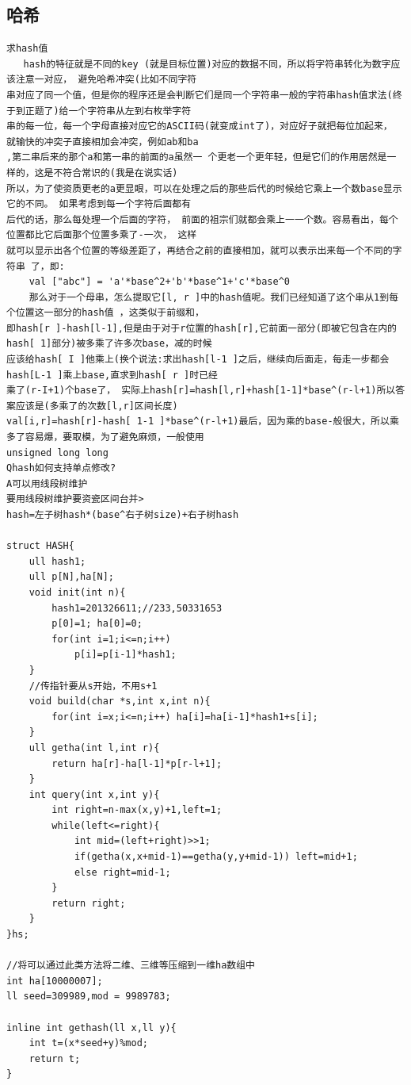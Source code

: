 \documentclass[twoside]{article}
\begin{document}
\subsection{哈希}
\begin{lstlisting}
求hash值
   hash的特征就是不同的key (就是目标位置)对应的数据不同，所以将字符串转化为数字应该注意一对应， 避免哈希冲突(比如不同字符
串对应了同一个值，但是你的程序还是会判断它们是同一个字符串一般的字符串hash值求法(终于到正题了)给一个字符串从左到右枚举字符
串的每一位，每一个字母直接对应它的ASCII码(就变成int了)，对应好子就把每位加起来， 就输快的冲突子直接相加会冲突，例如ab和ba
,第二串后来的那个a和第一串的前面的a虽然一 个更老一个更年轻，但是它们的作用居然是一样的，这是不符合常识的(我是在说实话)
所以，为了使资质更老的a更显眼，可以在处理之后的那些后代的时候给它乘上一个数base显示它的不同。 如果考虑到每一个字符后面都有
后代的话，那么每处理一个后面的字符， 前面的祖宗们就都会乘上一一个数。容易看出，每个位置都比它后面那个位置多乘了-一次， 这样
就可以显示出各个位置的等级差距了，再结合之前的直接相加，就可以表示出来每一个不同的字符串 了，即:
    val ["abc"] = 'a'*base^2+'b'*base^1+'c'*base^0
    那么对于一个母串，怎么提取它[l, r ]中的hash值呢。我们已经知道了这个串从1到每个位置这一部分的hash值 ，这类似于前缀和，
即hash[r ]-hash[l-1],但是由于对于r位置的hash[r],它前面一部分(即被它包含在内的hash[ 1]部分)被多乘了许多次base，减的时候
应该给hash[ I ]他乘上(换个说法:求出hash[l-1 ]之后，继续向后面走，每走一步都会hash[L-1 ]乘上base,直求到hash[ r ]时已经
乘了(r-I+1)个base了， 实际上hash[r]=hash[l,r]+hash[1-1]*base^(r-l+1)所以答案应该是(多乘了的次数[l,r]区间长度)
val[i,r]=hash[r]-hash[ 1-1 ]*base^(r-l+1)最后，因为乘的base-般很大，所以乘多了容易爆，要取模，为了避免麻烦，一般使用
unsigned long long
Qhash如何支持单点修改?
A可以用线段树维护
要用线段树维护要资瓷区间台并>
hash=左子树hash*(base^右子树size)+右子树hash

struct HASH{
    ull hash1;
    ull p[N],ha[N];
    void init(int n){
        hash1=201326611;//233,50331653
        p[0]=1; ha[0]=0;
        for(int i=1;i<=n;i++)
            p[i]=p[i-1]*hash1;
    }
    //传指针要从s开始，不用s+1
    void build(char *s,int x,int n){
        for(int i=x;i<=n;i++) ha[i]=ha[i-1]*hash1+s[i];
    }
    ull getha(int l,int r){
        return ha[r]-ha[l-1]*p[r-l+1];
    }
    int query(int x,int y){
        int right=n-max(x,y)+1,left=1;
        while(left<=right){
            int mid=(left+right)>>1;
            if(getha(x,x+mid-1)==getha(y,y+mid-1)) left=mid+1;
            else right=mid-1;
        }
        return right;
    }
}hs;

//将可以通过此类方法将二维、三维等压缩到一维ha数组中
int ha[10000007];
ll seed=309989,mod = 9989783;

inline int gethash(ll x,ll y){
    int t=(x*seed+y)%mod;
    return t;
}
\end{lstlisting}
\end{document}
